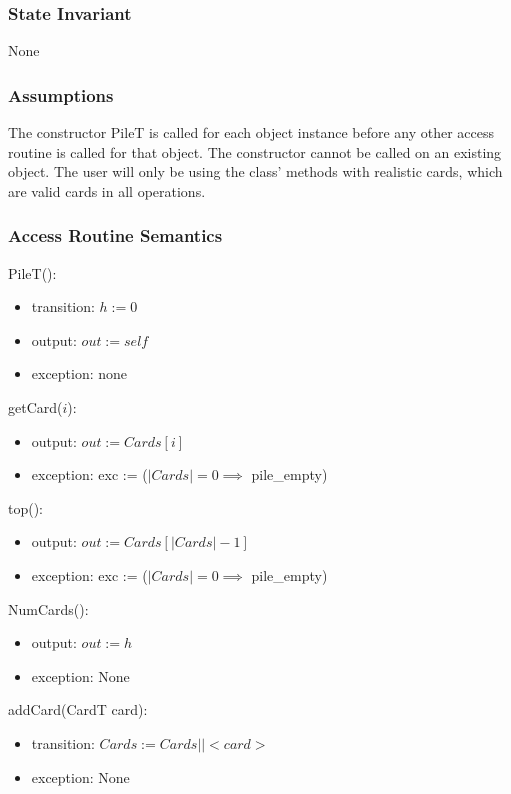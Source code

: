 \documentclass[12pt]{article}
\begin{document}
\subsubsection* {State Invariant}

None

\subsubsection* {Assumptions}

The constructor PileT is called for each object instance before any other
access routine is called for that object.  The constructor cannot be called on
an existing object. The user will only be using the class' methods with realistic cards, which
are valid cards in all operations.

\subsubsection* {Access Routine Semantics}

PileT():
\begin{itemize}
\item transition: $h := 0$
\item output: $out := \mathit{self}$
\item exception: none
\end{itemize}

\noindent getCard($i$):
\begin{itemize}
\item output: $out := Cards[i]$
\item exception: exc := ($|Cards| = 0 \implies$ pile\_empty)
\end{itemize}

\noindent top():
\begin{itemize}
\item output: $out := Cards[|Cards|-1]$
\item exception: exc := ($|Cards| = 0 \implies$ pile\_empty)
\end{itemize}

\noindent NumCards():
\begin{itemize}
\item output: $out := h$
\item exception: None
\end{itemize}

\noindent addCard(CardT card):
\begin{itemize}
\item transition: $Cards := Cards||<card>$
\item exception: None
\end{itemize}
\end{document}

